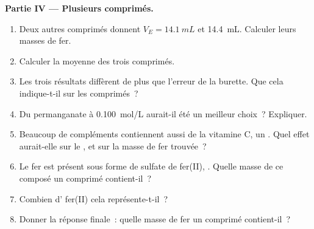 \begin{problem}
\medskip
\noindent\textbf{Partie IV --- Plusieurs comprimés.}
\begin{enumerate}[resume]
  \item Deux autres comprimés donnent $V_E = \qty{14.1}{mL}$ et
        \qty{14.4}{mL}. Calculer leurs masses de fer.
  \item Calculer la moyenne des trois comprimés.
  \item Les trois résultats diffèrent de plus que l'erreur de la
        burette. Que cela indique-t-il sur les comprimés~?
  \item Du permanganate à \qty{0.100}{mol/L} aurait-il été un meilleur
        choix~? Expliquer.
  \item Beaucoup de compléments contiennent aussi de la vitamine C, un
        . Quel effet aurait-elle sur le , et sur la masse
        de fer trouvée~?
  \item Le fer est présent sous forme de sulfate de fer(II), .
        Quelle masse de ce composé un comprimé contient-il~?
  \item Combien d' fer(II) cela représente-t-il~?
  \item Donner la réponse finale~: quelle masse de fer un comprimé
        contient-il~?
\end{enumerate}
\end{problem}

